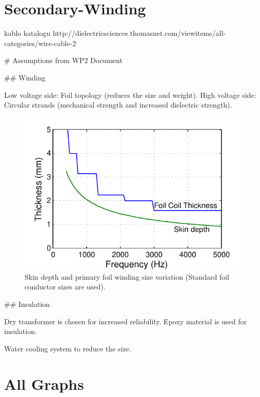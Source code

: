 \documentclass[a4paper, 11pt]{article} %
\begin{document}
\section{Secondary-Winding}
kablo katalogu
http://dielectricsciences.thomasnet.com/viewitems/all-categories/wire-cable-2





# Assumptions from WP2 Document



## Winding

Low voltage side: Foil topology (reduces the size and weight).
High voltage side: Circular strands (mechanical strength and increased dielectric strength).


\begin{figure}[]
  \centering
    \includegraphics[]{primary_thickness}
  \caption{Skin depth and primary foil winding size variation (Standard foil conductor sizes are used).}
  \label{primary_thickness}
\end{figure}

## Insulation 

Dry transformer is chosen for increased reliability. Epoxy material is used for insulation.

Water cooling system to reduce the size.


\section{All Graphs}
\end{document}
